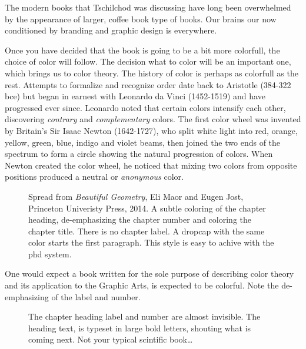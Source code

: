 The modern books that Tschilchod was discussing have long been overwhelmed by the appearance of larger, coffee book type of books. Our brains our now conditioned by branding and graphic design is everywhere. 

Once you have decided that the book is going to be a bit more colorfull, the choice of color will follow. The decision what to color will be an important one, which brings us to color theory. The history of color is perhaps as colorfull as the rest. Attempts to formalize and recognize order date back to Aristotle (384-322 bce) but began in earnest with Leonardo da Vinci (1452-1519) and have progressed ever since. Leonardo noted that certain colors intensify each other, discovering \textit{contrary} and \textit{complementary} colors. The first color wheel was invented by Britain's Sir Isaac Newton (1642-1727), who split white light into red, orange, yellow, green, blue, indigo and violet beams, then joined the two ends of the spectrum to form a circle showing the natural progression of colors. When Newton created the color wheel, he noticed that mixing two colors from opposite positions produced a neutral or \textit{anonymous} color.


\begin{figure}[htbp]
\parindent=0pt
\centering
{}
\caption{Spread from \textit{Beautiful Geometry}, Eli Maor and Eugen Jost, Princeton Univeristy Press, 2014. A subtle coloring of the chapter heading, de-emphasizing the chapter number and coloring the chapter title. There is no chapter label. A dropcap with the same color starts the first paragraph. This style is easy to achive with the phd system.}
\end{figure}


\begin{figure}[htbp]
\parindent=0pt
\centering
{}
\bigskip

\end{figure}

One would expect a book written for the sole purpose of describing color theory and its application to the Graphic Arts, is expected to be colorful. Note the de-emphasizing of the label and number. 

\begin{figure}[htbp]
\parindent=0pt
\centering
{}
The chapter heading label and number are almost invisible. The heading text, is typeset in large bold letters, shouting what is coming next. Not your typical scintific book\ldots
\bigskip

\end{figure}

